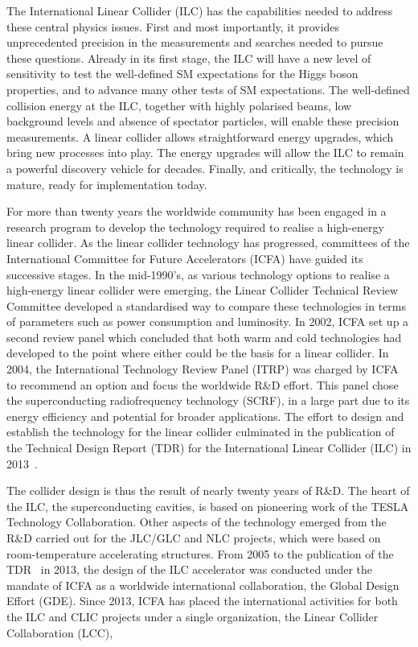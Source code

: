 \documentclass[%
 reprint,
 amsmath,amssymb,
 aps,
]{revtex4-1}
\begin{document}
The International Linear Collider (ILC) has the capabilities needed
to address these central physics issues.  First and most importantly, it provides
unprecedented precision in the measurements and searches needed to
pursue these questions.  Already in its first stage, the 
ILC will have a new level of sensitivity to test the well-defined SM
expectations for the Higgs boson properties, and to advance many other 
tests of SM expectations.  
The well-defined collision energy at the ILC, together with highly polarised beams, low background levels and absence of spectator particles, will enable these precision measurements.
    A linear collider allows straightforward energy
upgrades, which bring new processes into play. 
The energy upgrades will allow the ILC to remain a powerful 
discovery vehicle for decades. 
Finally, and critically, the technology is mature, 
ready for implementation today.

For more than twenty years the worldwide community has been engaged in
a research program to develop the technology required to realise a
high-energy linear collider.  As the linear collider technology has
progressed,
committees of   the International Committee for Future Accelerators
(ICFA) have  guided its successive stages.
In the mid-1990's, as various technology options to
realise a high-energy linear collider were emerging, the 
Linear Collider Technical Review Committee developed a standardised
way to  compare  these  technologies in terms of parameters such as
power consumption and luminosity. In 2002, ICFA set up a second
review panel which concluded that both warm and cold technologies had
developed to the point where either could be the basis for a linear
collider. In 2004, the  International Technology Review Panel
(ITRP) was charged by ICFA to recommend an option and focus the
worldwide R\&D effort.  This panel chose the  superconducting
radiofrequency technology (SCRF), in a large part due to its
energy efficiency and potential for broader applications. 
The effort to design and
establish the technology for the linear collider culminated in the
publication of the Technical Design Report (TDR) for the International
Linear Collider (ILC) in 2013~\cite{Behnke:2013xla}. 


The collider design is thus the result of nearly twenty years of
R\&D. The heart of the ILC, the superconducting cavities, is based on
pioneering work of the TESLA Technology Collaboration. Other aspects of the 
technology
emerged from the R\&D carried out for the JLC/GLC and NLC projects,
which were based on room-temperature accelerating structures. From
2005 to the publication of the TDR~\cite{Behnke:2013xla} in 2013, the
design of the ILC accelerator was conducted under the mandate of ICFA
as a worldwide
international collaboration, the Global Design Effort (GDE). 
Since 2013, ICFA has placed the  international activities for both the ILC and CLIC
projects under a single organization, 
the Linear Collider Collaboration (LCC),
\end{document}
